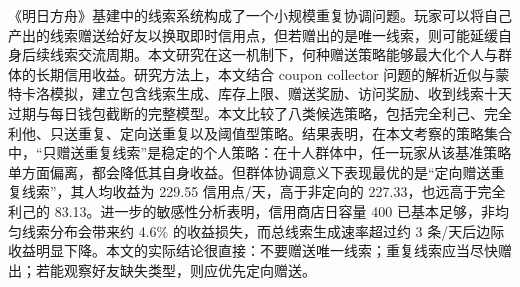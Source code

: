 \documentclass{rubbish}
\begin{document}
\makerubbishtitle

\begin{rubbishabstract}
《明日方舟》基建中的线索系统构成了一个小规模重复协调问题。玩家可以将自己产出的线索赠送给好友以换取即时信用点，但若赠出的是唯一线索，则可能延缓自身后续线索交流周期。本文研究在这一机制下，何种赠送策略能够最大化个人与群体的长期信用收益。研究方法上，本文结合 coupon collector 问题的解析近似与蒙特卡洛模拟，建立包含线索生成、库存上限、赠送奖励、访问奖励、收到线索十天过期与每日钱包截断的完整模型。本文比较了八类候选策略，包括完全利己、完全利他、只送重复、定向送重复以及阈值型策略。结果表明，在本文考察的策略集合中，“只赠送重复线索”是稳定的个人策略：在十人群体中，任一玩家从该基准策略单方面偏离，都会降低其自身收益。但群体协调意义下表现最优的是“定向赠送重复线索”，其人均收益为 229.55 信用点/天，高于非定向的 227.33，也远高于完全利己的 83.13。进一步的敏感性分析表明，信用商店日容量 400 已基本足够，非均匀线索分布会带来约 4.6\% 的收益损失，而总线索生成速率超过约 3 条/天后边际收益明显下降。本文的实际结论很直接：不要赠送唯一线索；重复线索应当尽快赠出；若能观察好友缺失类型，则应优先定向赠送。
\end{rubbishabstract}
\end{document}
